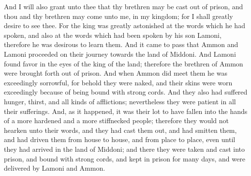 And I will also grant unto thee that thy brethren may be cast out of prison, and thou and thy brethren may come unto me, in my kingdom; for I shall greatly desire to see thee. For the king was greatly astonished at the words which he had spoken, and also at the words which had been spoken by his son Lamoni, therefore he was desirous to learn them.
\bverse \iffalse And it came to pass that Ammon and Lamoni proceeded on their journey towards the land of Middoni. And Lamoni found favor in the eyes of the king of the land; therefore the brethren of Ammon were brought forth out of prison. \fi
And it came to pass that Ammon and Lamoni proceeded on their journey towards the land of Middoni. And Lamoni found favor in the eyes of the king of the land; therefore the brethren of Ammon were brought forth out of prison.
\bverse \iffalse And when Ammon did meet them he was exceedingly sorrowful, for behold they were naked, and their skins were worn exceedingly because of being bound with strong cords. And they also had suffered hunger, thirst, and all kinds of afflictions; nevertheless they were patient in all their sufferings. \fi
And when Ammon did meet them he was exceedingly sorrowful, for behold they were naked, and their skins were worn exceedingly because of being bound with strong cords. And they also had suffered hunger, thirst, and all kinds of afflictions; nevertheless they were patient in all their sufferings.
\bverse \iffalse And, as it happened, it was their lot to have fallen into the hands of a more hardened and a more stiffnecked people; therefore they would not hearken unto their words, and they had cast them out, and had smitten them, and had driven them from house to house, and from place to place, even until they had arrived in the land of Middoni; and there they were taken and cast into prison, and bound with strong cords, and kept in prison for many days, and were delivered by Lamoni and Ammon. \fi
And, as it happened, it was their lot to have fallen into the hands of a more hardened and a more stiffnecked people; therefore they would not hearken unto their words, and they had cast them out, and had smitten them, and had driven them from house to house, and from place to place, even until they had arrived in the land of Middoni; and there they were taken and cast into prison, and bound with strong cords, and kept in prison for many days, and were delivered by Lamoni and Ammon.
\bchapter
\bverse \iffalse Now when Ammon and his brethren separated themselves in the borders of the land of the Lamanites, behold Aaron took his journey towards the land which was called by the Lamanites, Jerusalem, calling it after the land of their fathers' nativity; and it was away joining the borders of Mormon. \fi
